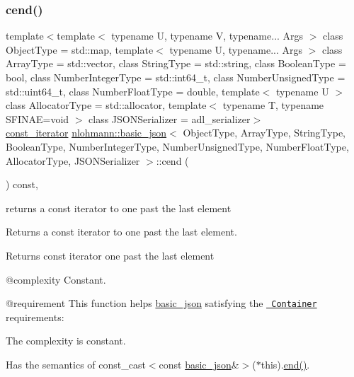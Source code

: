 \subsubsection{\texorpdfstring{cend()}{cend()}}
{\footnotesize\ttfamily template$<$template$<$ typename U, typename V, typename... Args $>$ class Object\+Type = std\+::map, template$<$ typename U, typename... Args $>$ class Array\+Type = std\+::vector, class String\+Type  = std\+::string, class Boolean\+Type  = bool, class Number\+Integer\+Type  = std\+::int64\+\_\+t, class Number\+Unsigned\+Type  = std\+::uint64\+\_\+t, class Number\+Float\+Type  = double, template$<$ typename U $>$ class Allocator\+Type = std\+::allocator, template$<$ typename T, typename S\+F\+I\+N\+A\+E=void $>$ class J\+S\+O\+N\+Serializer = adl\+\_\+serializer$>$ \\
\mbox{\hyperlink{classnlohmann_1_1basic__json_a41a70cf9993951836d129bb1c2b3126a}{const\+\_\+iterator}} \mbox{\hyperlink{classnlohmann_1_1basic__json}{nlohmann\+::basic\+\_\+json}}$<$ Object\+Type, Array\+Type, String\+Type, Boolean\+Type, Number\+Integer\+Type, Number\+Unsigned\+Type, Number\+Float\+Type, Allocator\+Type, J\+S\+O\+N\+Serializer $>$\+::cend (\begin{DoxyParamCaption}{ }\end{DoxyParamCaption}) const\hspace{0.3cm}{\ttfamily [inline]}, {\ttfamily [noexcept]}}



returns a const iterator to one past the last element 

Returns a const iterator to one past the last element.

 \begin{DoxyReturn}{Returns}
const iterator one past the last element
\end{DoxyReturn}
@complexity Constant.

@requirement This function helps {\ttfamily \mbox{\hyperlink{classnlohmann_1_1basic__json}{basic\+\_\+json}}} satisfying the \href{http://en.cppreference.com/w/cpp/concept/Container}{\texttt{ Container}} requirements\+:
\begin{DoxyItemize}
\item The complexity is constant.
\item Has the semantics of {\ttfamily const\+\_\+cast$<$const \mbox{\hyperlink{classnlohmann_1_1basic__json}{basic\+\_\+json}}\&$>$($\ast$this).\mbox{\hyperlink{classnlohmann_1_1basic__json_a13e032a02a7fd8a93fdddc2fcbc4763c}{end()}}}.
\end{DoxyItemize}

